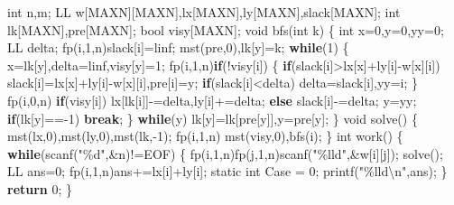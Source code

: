 \documentclass[
]{article}
\newenvironment{Shaded}{}{}
\newcommand{\AttributeTok}[1]{\textcolor[rgb]{0.49,0.56,0.16}{#1}}
\newcommand{\ControlFlowTok}[1]{\textcolor[rgb]{0.00,0.44,0.13}{\textbf{#1}}}
\newcommand{\DataTypeTok}[1]{\textcolor[rgb]{0.56,0.13,0.00}{#1}}
\newcommand{\DecValTok}[1]{\textcolor[rgb]{0.25,0.63,0.44}{#1}}
\newcommand{\NormalTok}[1]{#1}
\newcommand{\SpecialCharTok}[1]{\textcolor[rgb]{0.25,0.44,0.63}{#1}}
\newcommand{\StringTok}[1]{\textcolor[rgb]{0.25,0.44,0.63}{#1}}
\begin{document}
\begin{Shaded}
\begin{Highlighting}[]
\DataTypeTok{int}\NormalTok{ n,m;}
\NormalTok{LL w[MAXN][MAXN],lx[MAXN],ly[MAXN],slack[MAXN];}
\DataTypeTok{int}\NormalTok{ lk[MAXN],pre[MAXN];}
\DataTypeTok{bool}\NormalTok{ visy[MAXN];}
\DataTypeTok{void}\NormalTok{ bfs(}\DataTypeTok{int}\NormalTok{ k)}
\NormalTok{\{}
    \DataTypeTok{int}\NormalTok{ x=}\DecValTok{0}\NormalTok{,y=}\DecValTok{0}\NormalTok{,yy=}\DecValTok{0}\NormalTok{; LL delta;}
\NormalTok{    fp(i,}\DecValTok{1}\NormalTok{,n)slack[i]=linf;}
\NormalTok{    mst(pre,}\DecValTok{0}\NormalTok{),lk[y]=k;}
    \ControlFlowTok{while}\NormalTok{(}\DecValTok{1}\NormalTok{)}
\NormalTok{    \{}
\NormalTok{        x=lk[y],delta=linf,visy[y]=}\DecValTok{1}\NormalTok{;}
\NormalTok{        fp(i,}\DecValTok{1}\NormalTok{,n)}\ControlFlowTok{if}\NormalTok{(!visy[i])}
\NormalTok{        \{}
            \ControlFlowTok{if}\NormalTok{(slack[i]\textgreater{}lx[x]+ly[i]{-}w[x][i])}
\NormalTok{                slack[i]=lx[x]+ly[i]{-}w[x][i],pre[i]=y; }
            \ControlFlowTok{if}\NormalTok{(slack[i]\textless{}delta) delta=slack[i],yy=i;}
\NormalTok{        \}}
\NormalTok{        fp(i,}\DecValTok{0}\NormalTok{,n)}
            \ControlFlowTok{if}\NormalTok{(visy[i]) lx[lk[i]]{-}=delta,ly[i]+=delta;}
            \ControlFlowTok{else}\NormalTok{ slack[i]{-}=delta;}
\NormalTok{        y=yy;}
        \ControlFlowTok{if}\NormalTok{(lk[y]=={-}}\DecValTok{1}\NormalTok{) }\ControlFlowTok{break}\NormalTok{;}
\NormalTok{    \}}
    \ControlFlowTok{while}\NormalTok{(y) lk[y]=lk[pre[y]],y=pre[y];}
\NormalTok{\}}
\DataTypeTok{void}\NormalTok{ solve()}
\NormalTok{\{}
\NormalTok{    mst(lx,}\DecValTok{0}\NormalTok{),mst(ly,}\DecValTok{0}\NormalTok{),mst(lk,{-}}\DecValTok{1}\NormalTok{);}
\NormalTok{    fp(i,}\DecValTok{1}\NormalTok{,n) mst(visy,}\DecValTok{0}\NormalTok{),bfs(i);}
\NormalTok{\}}
\DataTypeTok{int}\NormalTok{ work()}
\NormalTok{\{}
    \ControlFlowTok{while}\NormalTok{(scanf(}\StringTok{"}\SpecialCharTok{\%d}\StringTok{"}\NormalTok{,\&n)!=EOF)}
\NormalTok{    \{}
\NormalTok{        fp(i,}\DecValTok{1}\NormalTok{,n)fp(j,}\DecValTok{1}\NormalTok{,n)scanf(}\StringTok{"}\SpecialCharTok{\%lld}\StringTok{"}\NormalTok{,\&w[i][j]);}
\NormalTok{        solve();}
\NormalTok{        LL ans=}\DecValTok{0}\NormalTok{;}
\NormalTok{        fp(i,}\DecValTok{1}\NormalTok{,n)ans+=lx[i]+ly[i];}
        \AttributeTok{static} \DataTypeTok{int}\NormalTok{ Case = }\DecValTok{0}\NormalTok{;}
\NormalTok{        printf(}\StringTok{"}\SpecialCharTok{\%lld\textbackslash{}n}\StringTok{"}\NormalTok{,ans);}
\NormalTok{    \}}
    \ControlFlowTok{return} \DecValTok{0}\NormalTok{;}
\NormalTok{\}}
\end{Highlighting}
\end{Shaded}
\end{document}
